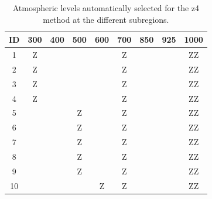 \documentclass{ametsoc}
\begin{document}
\begin{table}[htbp]
	\footnotesize
	\caption{Atmospheric levels automatically selected for the z4 method at the different subregions.}
	\begin{center}
		\begin{tabular}{ccccccccc}
			\hline \textbf{ID} & \textbf{300} & \textbf{400} & \textbf{500} & \textbf{600} & \textbf{700} & \textbf{850} & \textbf{925} & \textbf{1000} \\ 
			\hline 
			1  & Z &   &   &   & Z &   &   & ZZ \\
			2  & Z &   &   &   & Z &   &   & ZZ \\
			3  & Z &   &   &   & Z &   &   & ZZ \\
			4  & Z &   &   &   & Z &   &   & ZZ \\
			5  &   &   & Z &   & Z &   &   & ZZ \\
			6  &   &   & Z &   & Z &   &   & ZZ \\
			7  &   &   & Z &   & Z &   &   & ZZ \\
			8  &   &   & Z &   & Z &   &   & ZZ \\
			9  &   &   & Z &   & Z &   &   & ZZ \\
			10 &   &   &   & Z & Z &   &   & ZZ \\
			\hline 
		\end{tabular} 
	\end{center}
	\label{table:levels_GA_z4}
\end{table}
\end{document}
